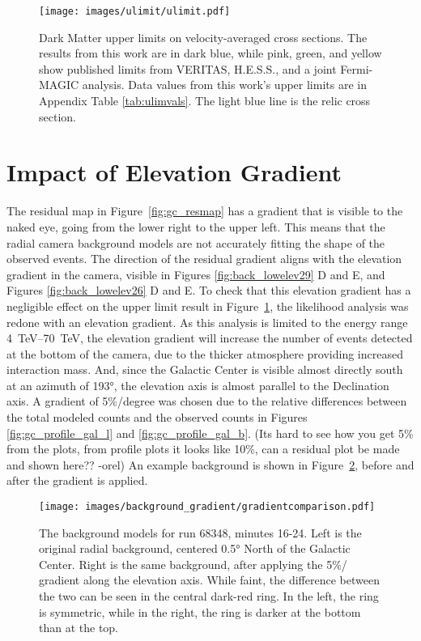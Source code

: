   \begin{figure}[ht]
    \centering
    \texttt{[image: images/ulimit/ulimit.pdf]}
    \caption[Dark Matter Upper Limit Plot]{
      Dark Matter upper limits on velocity-averaged cross sections.
      The results from this work are in dark blue, while pink, green, and yellow show published limits from VERITAS, H.E.S.S., and a joint Fermi-MAGIC analysis.
      Data values from this work's upper limits are in Appendix Table \ref{tab:ulimvals}.
      The light blue line is the relic cross section.
    }
    \label{fig:ulim}
  \end{figure}
  
\FloatBarrier

\section{Impact of Elevation Gradient}\label{sec:elevgradient}

  The residual map in Figure~\ref{fig:gc_resmap} has a gradient that is visible to the naked eye, going from the lower right to the upper left.
  This means that the radial camera background models are not accurately fitting the shape of the observed events.
  The direction of the residual gradient aligns with the elevation gradient in the camera, visible in Figures \ref{fig:back_lowelev29} D and E, and Figures \ref{fig:back_lowelev26} D and E.
  To check that this elevation gradient has a negligible effect on the upper limit result in Figure~\ref{fig:ulim}, the likelihood analysis was redone with an elevation gradient.
  As this analysis is limited to the energy range \SIrange{4}{70}{TeV}, the elevation gradient will increase the number of events detected at the bottom of the camera, due to the thicker atmosphere providing increased interaction mass.
  And, since the Galactic Center is visible almost directly south at an azimuth of \ang{193}, the elevation axis is almost parallel to the Declination axis.
  A gradient of 5\%/degree was chosen due to the relative differences between the total modeled counts and the observed counts in Figures \ref{fig:gc_profile_gal_l} and \ref{fig:gc_profile_gal_b}.
  {\color{red}(Its hard to see how you get 5\% from the plots, from profile plots it looks like 10\%, can a residual plot be made and shown here?? -orel)}
  An example background is shown in Figure~\ref{fig:bkg_flatvsgrad}, before and after the gradient is applied.
  
  \begin{figure}[ht]
    \centering
    \texttt{[image: images/background\_gradient/gradientcomparison.pdf]}
    \caption[Background Gradient Comparison]{
      The background models for run 68348, minutes 16-24.
      Left is the original radial background, centered \ang{0.5} North of the Galactic Center.
      Right is the same background, after applying the 5\%/\degree{} gradient along the elevation axis.
      While faint, the difference between the two can be seen in the central dark-red ring.
      In the left, the ring is symmetric, while in the right, the ring is darker at the bottom than at the top.
    }
    \label{fig:bkg_flatvsgrad}
  \end{figure}
  

